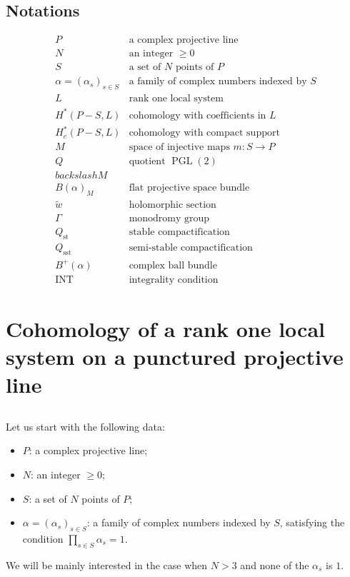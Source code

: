 \documentclass[12pt,a4paper]{article}
\theoremstyle{plain}
\theoremstyle{definition}
\theoremstyle{remark}
\DeclareMathOperator{\PGL}{PGL}
\numberwithin{equation}{section}
\providecommand{\PGL}{\operatorname{PGL}}
\begin{document}
\subsection*{Notations}
\[
\begin{array}{ll}
P & \text{a complex projective line} \\
N & \text{an integer } \geq 0 \\
S & \text{a set of } N \text{ points of } P \\
\alpha = (\alpha_s)_{s \in S} & \text{a family of complex numbers indexed by } S \\
L & \text{rank one local system} \\
H^*(P-S, L) & \text{cohomology with coefficients in } L \\
H^*_c(P-S, L) & \text{cohomology with compact support} \\
M & \text{space of injective maps } m: S \to P \\
Q & \text{quotient } \PGL(2) \\backslash M \\
B(\alpha)_M & \text{flat projective space bundle} \\
\widetilde{w} & \text{holomorphic section} \\
\Gamma & \text{monodromy group} \\
Q_{\mathrm{st}} & \text{stable compactification} \\
Q_{\mathrm{sst}} & \text{semi-stable compactification} \\
B^+(\alpha) & \text{complex ball bundle} \\
\mathrm{INT} & \text{integrality condition}
\end{array}
\]


\section{Cohomology of a rank one local system on a punctured projective line}

\subsection{}
Let us start with the following data:
\begin{itemize}
\item[$\bullet$] $P$: a complex projective line;
\item[$\bullet$] $N$: an integer $\geq 0$;
\item[$\bullet$] $S$: a set of $N$ points of $P$;
\item[$\bullet$] $\alpha = (\alpha_s)_{s \in S}$: a family of complex numbers indexed by $S$, satisfying the condition $\prod_{s \in S} \alpha_s = 1$.
\end{itemize}
We will be mainly interested in the case when $N > 3$ and none of the $\alpha_s$ is $1$.
\end{document}
